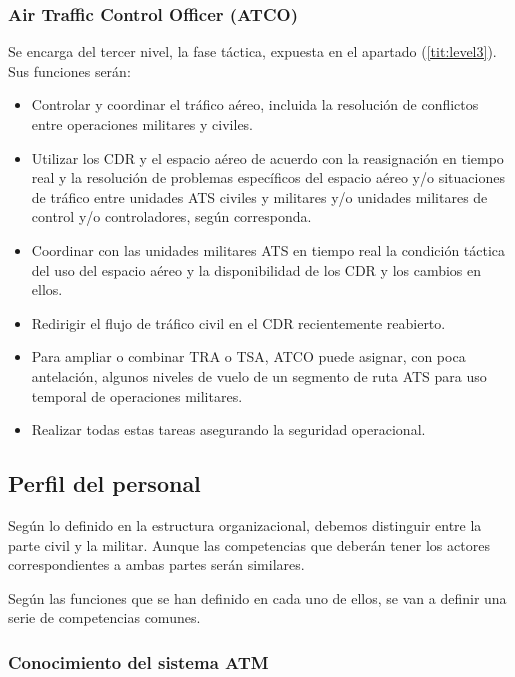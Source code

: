 \subsubsection{Air Traffic Control Officer (ATCO)}

Se encarga del tercer nivel, la fase táctica, expuesta en el apartado (\ref{tit:level3}). Sus funciones serán:

\begin{itemize}
    \item Controlar y coordinar el tráfico aéreo, incluida la resolución de conflictos entre operaciones militares y civiles.
    
    \item Utilizar los CDR y el espacio aéreo de acuerdo con la reasignación en tiempo real y la resolución de problemas específicos del espacio aéreo y/o situaciones de tráfico entre unidades ATS civiles y militares y/o unidades militares de control y/o controladores, según corresponda.
    
    \item Coordinar con las unidades militares ATS en tiempo real la condición táctica del uso del espacio aéreo y la disponibilidad de los CDR y los cambios en ellos.
    
    \item Redirigir el flujo de tráfico civil en el CDR recientemente reabierto.
    
    \item Para ampliar o combinar TRA o TSA, ATCO puede asignar, con poca antelación, algunos niveles de vuelo de un segmento de ruta ATS para uso temporal de operaciones militares.
    
    \item Realizar todas estas tareas asegurando la seguridad operacional.
\end{itemize}

\subsection{Perfil del personal}

Según lo definido en la estructura organizacional, debemos distinguir entre la parte civil y la militar. Aunque las competencias que deberán tener los actores correspondientes a ambas partes serán similares.

Según las funciones que se han definido en cada uno de ellos, se van a definir una serie de competencias comunes.

\subsubsection{Conocimiento del sistema ATM}

